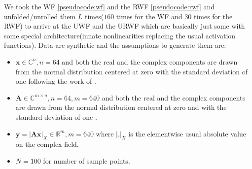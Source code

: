 We took the \ac{WF}\cite{Candes2014} \cref{pseudocode:wf} and the \ac{RWF}\cite{Zhang2016} \cref{pseudocode:rwf}  and unfolded/unrolled them $L$ times($160$ times for the \ac{WF} 
and $30$ times for the \ac{RWF}) to arrive at the \ac{UWF} and the \ac{URWF} which are basically just some \nn\cite{Goodfellow2016}\cite{Bishop2006}\index{\nn} 
with some special architecture(innate nonlinearities replacing the usual activation functions). Data are synthetic and the assumptions to generate them are:
\begin{itemize}
  \item $\boldsymbol{x} \in \mathbb{C}^{n}, n=64$ and both the real and the complex components are drawn from the normal distribution 
  centered at zero with the standard deviation of one following the work of \cite{Naimipour2020}\cite{Naimipour2020a}.
  \item $\boldsymbol{A} \in \mathbb{C}^{m \times n}, n=64, m=640$ and both the real and the complex components are drawn from the normal distribution 
  centered at zero and with the standard deviation of one \cite{Naimipour2020}\cite{Naimipour2020a}.
  \item $\boldsymbol{y}= \left|\boldsymbol{A}\boldsymbol{x}\right|_{X} \in \mathbb{R}^m, m=640$ where $\left|\boldsymbol{.}\right|_X$ is the elementwise usual absolute value on the complex field.
  \item $N=100$ for number of sample points.
\end{itemize}

